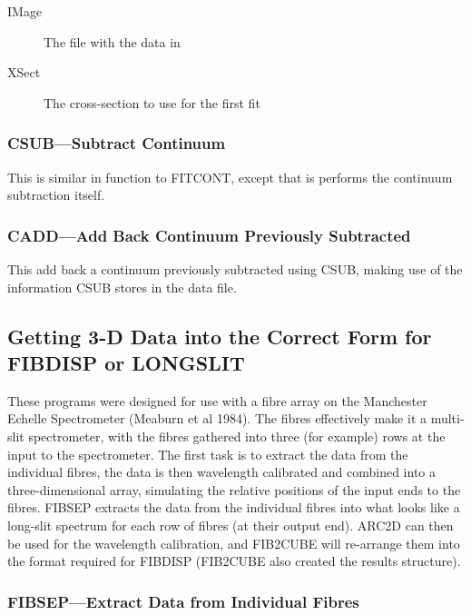 \begin{description}
\item[IMage] The file with the data in
\item[XSect] The cross-section to use for the first fit
\end{description}


\subsubsection{CSUB---Subtract Continuum}

This is similar in function to FITCONT, except that is performs the
continuum subtraction itself.

\subsubsection{CADD---Add Back Continuum Previously Subtracted}

This add back a continuum previously subtracted using CSUB, making use
of the information CSUB stores in the data file.

\subsection{\label{getting_3d_data_into_the_correct_form}Getting 3-D Data into the Correct Form for FIBDISP or LONGSLIT}

These programs were designed for use with a fibre array on the
Manchester Echelle Spectrometer (Meaburn et al 1984).
The fibres effectively make it a multi-slit spectrometer, with the
fibres gathered into three (for example) rows at the input to the
spectrometer.
The first task is to extract the data from the individual fibres, the
data is then wavelength calibrated and combined into a three-dimensional
array, simulating the relative positions of the input ends to the
fibres.
FIBSEP extracts the data from the individual fibres into what looks like a
long-slit spectrum for each row of fibres (at their output end).
ARC2D can then be used for the wavelength calibration, and FIB2CUBE will
re-arrange them into the format required for FIBDISP (FIB2CUBE also
created the results structure).

\subsubsection{FIBSEP---Extract Data from Individual Fibres}

